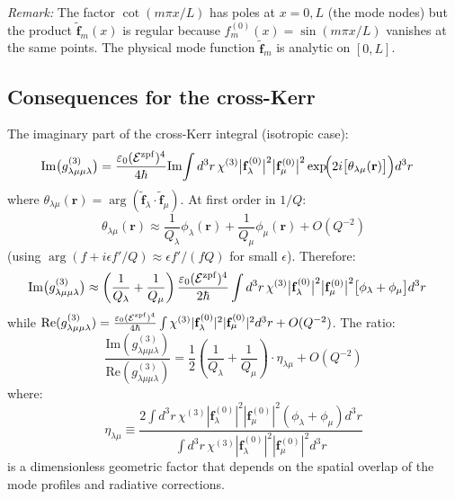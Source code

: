 \documentclass[12pt]{article}
\newcommand{\zpf}{{\rm zpf}}
\newcommand{\tf}{\tilde{\mathbf{f}}}
\begin{document}
\textit{Remark:} The factor $\cot(m\pi x/L)$ has poles at $x=0,L$ (the mode
nodes) but the product $\tf_m(x)$ is regular because $f_m^{(0)}(x)=\sin(m\pi x/L)$
vanishes at the same points.  The physical mode function $\tf_m$ is analytic
on $[0,L]$.

\subsection*{Consequences for the cross-Kerr}

The imaginary part of the cross-Kerr integral (isotropic case):
\begin{align}
  \mathrm{Im}\bigl(g^{(3)}_{\lambda\mu\mu\lambda}\bigr)
  &= \frac{\varepsilon_0(\mathcal{E}^\zpf)^4}{4\hbar}
  \mathrm{Im}\!\int d^3r\,\chi^{(3)}
  \bigl|\mathbf{f}^{(0)}_\lambda\bigr|^2\bigl|\mathbf{f}^{(0)}_\mu\bigr|^2
  \exp\!\Bigl(2i\bigl[\theta_{\lambda\mu}(\mathbf{r})\bigr]\Bigr)d^3r
  \label{eq:g3_im_expand}
\end{align}
where $\theta_{\lambda\mu}(\mathbf{r})=\arg(\tf_\lambda\cdot\tf_\mu)$.  At
first order in $1/Q$:
\begin{equation}
  \theta_{\lambda\mu}(\mathbf{r}) \approx
  \frac{1}{Q_\lambda}\phi_\lambda(\mathbf{r})
  + \frac{1}{Q_\mu}\phi_\mu(\mathbf{r})
  + O(Q^{-2})
  \label{eq:phase_expand}
\end{equation}
(using $\arg(f+i\epsilon f'\!/Q)\approx\epsilon f'/(fQ)$ for small $\epsilon$).
Therefore:
\begin{align}
  \mathrm{Im}\bigl(g^{(3)}_{\lambda\mu\mu\lambda}\bigr)
  &\approx \left(\frac{1}{Q_\lambda}+\frac{1}{Q_\mu}\right)
  \frac{\varepsilon_0(\mathcal{E}^\zpf)^4}{2\hbar}
  \int d^3r\,\chi^{(3)}
  \bigl|\mathbf{f}^{(0)}_\lambda\bigr|^2
  \bigl|\mathbf{f}^{(0)}_\mu\bigr|^2
  \bigl[\phi_\lambda+\phi_\mu\bigr]d^3r
  \label{eq:g3_im_explicit}
\end{align}
while $\mathrm{Re}(g^{(3)}_{\lambda\mu\mu\lambda})=\frac{\varepsilon_0
(\mathcal{E}^\zpf)^4}{4\hbar}\int\chi^{(3)}|\mathbf{f}^{(0)}_\lambda|^2
|\mathbf{f}^{(0)}_\mu|^2 d^3r+O(Q^{-2})$.  The ratio:
\begin{equation}
  \frac{\mathrm{Im}(g^{(3)}_{\lambda\mu\mu\lambda})}
  {\mathrm{Re}(g^{(3)}_{\lambda\mu\mu\lambda})}
  = \frac{1}{2}\!\left(\frac{1}{Q_\lambda}+\frac{1}{Q_\mu}\right)\cdot\eta_{\lambda\mu}
  + O(Q^{-2})
  \label{eq:ratio_highQ}
\end{equation}
where:
\begin{equation}
  \eta_{\lambda\mu} \equiv
  \frac{2\int d^3r\,\chi^{(3)}|\mathbf{f}^{(0)}_\lambda|^2
  |\mathbf{f}^{(0)}_\mu|^2(\phi_\lambda+\phi_\mu)d^3r}
  {\int d^3r\,\chi^{(3)}|\mathbf{f}^{(0)}_\lambda|^2
  |\mathbf{f}^{(0)}_\mu|^2 d^3r}
  \label{eq:eta}
\end{equation}
is a dimensionless geometric factor that depends on the spatial
overlap of the mode profiles and radiative corrections.
\end{document}

